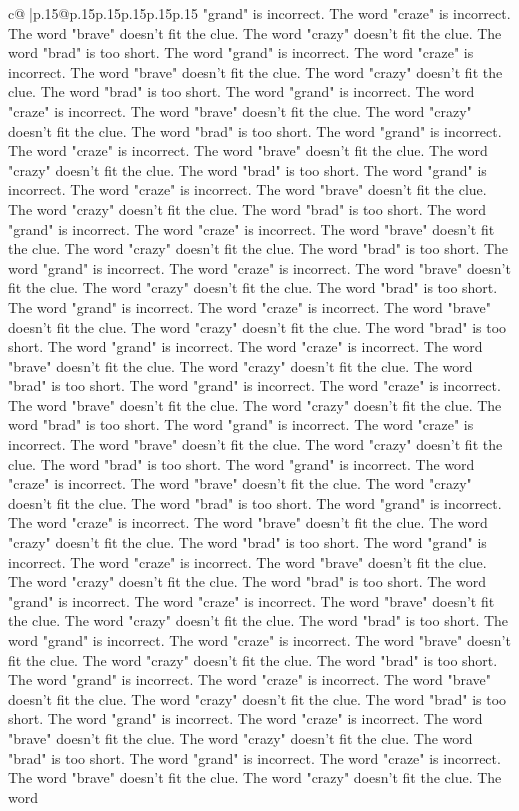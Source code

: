 \documentclass{article}
\begin{document}
{\begin{supertabular}{c@{$\;$}|p{.15\linewidth}@{}p{.15\linewidth}p{.15\linewidth}p{.15\linewidth}p{.15\linewidth}p{.15\linewidth}}
{{{"grand" is incorrect. The word "craze" is incorrect. The word "brave" doesn't fit the clue. The word "crazy" doesn't fit the clue. The word "brad" is too short. The word "grand" is incorrect. The word "craze" is incorrect. The word "brave" doesn't fit the clue. The word "crazy" doesn't fit the clue. The word "brad" is too short. The word "grand" is incorrect. The word "craze" is incorrect. The word "brave" doesn't fit the clue. The word "crazy" doesn't fit the clue. The word "brad" is too short. The word "grand" is incorrect. The word "craze" is incorrect. The word "brave" doesn't fit the clue. The word "crazy" doesn't fit the clue. The word "brad" is too short. The word "grand" is incorrect. The word "craze" is incorrect. The word "brave" doesn't fit the clue. The word "crazy" doesn't fit the clue. The word "brad" is too short. The word "grand" is incorrect. The word "craze" is incorrect. The word "brave" doesn't fit the clue. The word "crazy" doesn't fit the clue. The word "brad" is too short. The word "grand" is incorrect. The word "craze" is incorrect. The word "brave" doesn't fit the clue. The word "crazy" doesn't fit the clue. The word "brad" is too short. The word "grand" is incorrect. The word "craze" is incorrect. The word "brave" doesn't fit the clue. The word "crazy" doesn't fit the clue. The word "brad" is too short. The word "grand" is incorrect. The word "craze" is incorrect. The word "brave" doesn't fit the clue. The word "crazy" doesn't fit the clue. The word "brad" is too short. The word "grand" is incorrect. The word "craze" is incorrect. The word "brave" doesn't fit the clue. The word "crazy" doesn't fit the clue. The word "brad" is too short. The word "grand" is incorrect. The word "craze" is incorrect. The word "brave" doesn't fit the clue. The word "crazy" doesn't fit the clue. The word "brad" is too short. The word "grand" is incorrect. The word "craze" is incorrect. The word "brave" doesn't fit the clue. The word "crazy" doesn't fit the clue. The word "brad" is too short. The word "grand" is incorrect. The word "craze" is incorrect. The word "brave" doesn't fit the clue. The word "crazy" doesn't fit the clue. The word "brad" is too short. The word "grand" is incorrect. The word "craze" is incorrect. The word "brave" doesn't fit the clue. The word "crazy" doesn't fit the clue. The word "brad" is too short. The word "grand" is incorrect. The word "craze" is incorrect. The word "brave" doesn't fit the clue. The word "crazy" doesn't fit the clue. The word "brad" is too short. The word "grand" is incorrect. The word "craze" is incorrect. The word "brave" doesn't fit the clue. The word "crazy" doesn't fit the clue. The word "brad" is too short. The word "grand" is incorrect. The word "craze" is incorrect. The word "brave" doesn't fit the clue. The word "crazy" doesn't fit the clue. The word "brad" is too short. The word "grand" is incorrect. The word "craze" is incorrect. The word "brave" doesn't fit the clue. The word "crazy" doesn't fit the clue. The word "brad" is too short. The word "grand" is incorrect. The word "craze" is incorrect. The word "brave" doesn't fit the clue. The word "crazy" doesn't fit the clue. The word }}}
\end{supertabular}}
\end{document}
